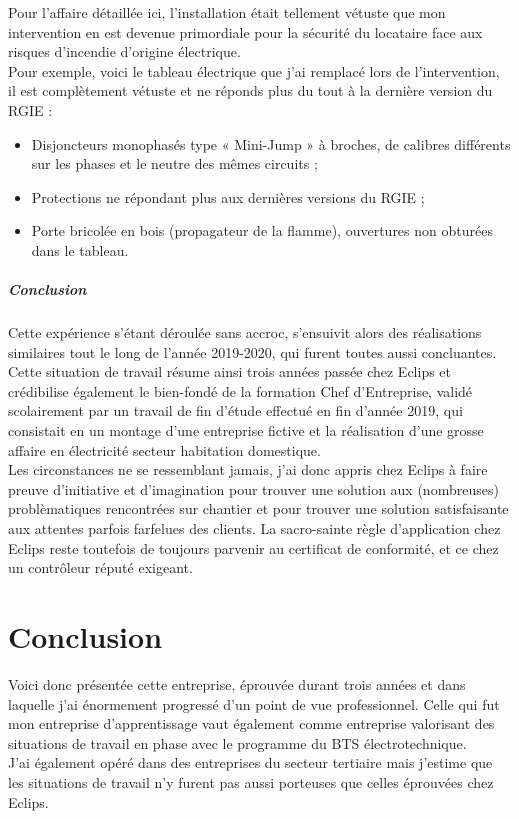 \documentclass[a4paper, 12pt]{article}
\begin{document}
Pour l'affaire détaillée ici, l'installation était tellement vétuste que mon intervention en est devenue primordiale pour la sécurité du locataire face aux risques d'incendie d'origine électrique.\\Pour exemple, voici le tableau électrique que j'ai remplacé lors de l'intervention, il est complètement vétuste et ne réponds plus du tout à la dernière version du RGIE :
\begin{itemize}
\item Disjoncteurs monophasés type « Mini-Jump » à broches, de calibres différents sur les phases et le neutre des mêmes circuits ;
\item Protections ne répondant plus aux dernières versions du RGIE ;
\item Porte bricolée en bois (propagateur de la flamme), ouvertures non obturées dans le tableau.
\end{itemize}

\subsubsection{Conclusion}

Cette expérience s'étant déroulée sans accroc, s'ensuivit alors des réalisations similaires tout le long de l'année 2019-2020, qui furent toutes aussi concluantes.\\ Cette situation de travail résume ainsi trois années passée chez Eclips et crédibilise également le bien-fondé de la formation Chef d'Entreprise, validé scolairement par un travail de fin d'étude effectué en fin d'année 2019, qui consistait en un montage d'une entreprise fictive et la réalisation d'une grosse affaire en électricité secteur habitation domestique.\\Les circonstances ne se ressemblant jamais, j'ai donc appris chez Eclips à faire preuve d'initiative et d'imagination pour trouver une solution aux (nombreuses) problèmatiques rencontrées sur chantier et pour trouver une solution satisfaisante aux attentes parfois farfelues des clients. La sacro-sainte règle d’application chez Eclips reste toutefois de toujours parvenir au certificat de conformité, et ce chez un contrôleur réputé exigeant.

\newpage

\part{Conclusion}

Voici donc présentée cette entreprise, éprouvée durant trois années et dans laquelle j'ai énormement progressé d'un point de vue professionnel. Celle qui fut mon entreprise d'apprentissage vaut également comme entreprise valorisant des situations de travail en phase avec le programme du BTS électrotechnique.\\J'ai également opéré dans des entreprises du secteur tertiaire mais j'estime que les situations de travail n'y furent pas aussi porteuses que celles éprouvées chez Eclips.\\
\end{document}
